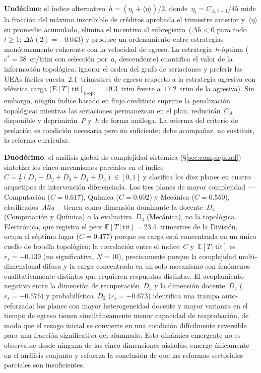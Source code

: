 \documentclass[11pt,letterpaper]{article}
\newcommand{\ETtit}{\mathbb{E}[T\,|\,\mathrm{tit}]}
\begin{document}
\textbf{Undécimo}: el índice alternativo~$h=(\eta_t+\langle\eta\rangle)/2$,
donde~$\eta_t=C_{A,t-1}/45$ mide la fracción del máximo inscribible de créditos
aprobada el trimestre anterior y~$\langle\eta\rangle$ su promedio acumulado, elimina
el incentivo al subregistro~($\Delta h<0$ para todo~$t\geq1$;
$\Delta h(2)=-0.043$) y produce un ordenamiento entre estrategias monótonamente
coherente con la velocidad de egreso.
La estrategia~$h$-óptima ($c^\ast=38$~cr/trim con selección por~$a_i$ descendente)
cuantifica el valor de la información topológica: ignorar el orden del grafo de
seriaciones y preferir las UEAs fáciles cuesta~$2.1$~trimestres de egreso respecto
a la estrategia agresiva con idéntica carga ($\mathrm{E}[T\mid\text{tit}]_{h\text{-opt}}
= 19.3$~trim frente a~$17.2$~trim de la agresiva).
Sin embargo, ningún índice basado en flujo crediticio suprime la penalización
topológica: mientras las seriaciones permanezcan en el plan, reducirán~$C_A$
disponible y deprimirán~$P$ y~$h$ de forma análoga.
La reforma del criterio de prelación es condición necesaria pero no suficiente;
debe acompañar, no sustituir, la reforma curricular.

\textbf{Duodécimo}: el análisis global de complejidad sistémica
(\S\ref{sec:complejidad}) sintetiza los cinco mecanismos parciales en el índice
$C=\tfrac{1}{5}(D_1+D_2+D_3+D_4+D_5)\in[0,1]$ y clasifica los diez planes en cuatro
arquetipos de intervención diferenciada.
Los tres planes de mayor complejidad ---Computación ($C=0.617$), Química ($C=0.602$)
y Mecánica ($C=0.550$), clasificados~\emph{Alta}--- tienen como dimensión dominante
la docente~$D_4$ (Computación y Química) o la evaluativa~$D_3$ (Mecánica), no la
topológica.
Electrónica, que registra el peor $\ETtit=23.5$~trimestres de la División, ocupa
el séptimo lugar ($C=0.477$) porque su carga está concentrada en un único cuello de
botella topológico; la correlación entre el índice~$C$ y~$\ETtit$ es
$r_s=-0.139$ (no significativa, $N=10$), precisamente porque la complejidad
multi-dimensional difusa y la carga concentrada en un solo mecanismo son fenómenos
cualitativamente distintos que requieren respuestas distintas.
El acoplamiento negativo entre la dimensión de recuperación~$D_5$ y la dimensión
docente~$D_4$ ($r_s=-0.576$) y probabilística~$D_2$ ($r_s=-0.673$) identifica una
trampa auto-reforzada: los planes con mayor heterogeneidad docente y mayor varianza en
el tiempo de egreso tienen simultáneamente menor capacidad de reaprobación, de modo
que el rezago inicial se convierte en una condición difícilmente reversible para una
fracción significativa del alumnado.
Esta dinámica emergente no es observable desde ninguna de las cinco dimensiones
aisladas; emerge únicamente en el análisis conjunto y refuerza la conclusión de que
las reformas sectoriales parciales son insuficientes.
\end{document}
